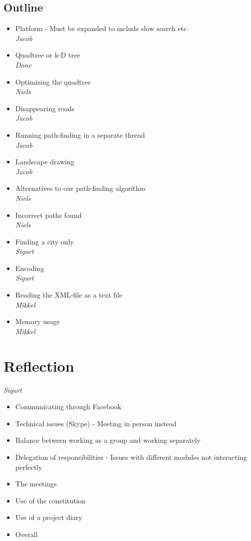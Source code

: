 \documentclass[a4paper,11pt]{article}
\begin{document}
\subsection{Outline}
\begin{itemize}
	\item Platform - Must be expanded to include slow search etc. \\
		\textsl{Jacob}
	\item Quadtree or k-D tree \\
		\textsl{Done}
	\item Optimizing the quadtree \\
		\textsl{Niels}
	\item Disappearing roads \\
		\textsl{Jacob}
	\item Running path-finding in a separate thread \\
		\textsl{Jacob}
	\item Landscape drawing \\
		\textsl{Jacob}
	\item Alternatives to our path-finding algorithm \\
		\textsl{Niels}
	\item Incorrect paths found \\
		\textsl{Niels}
	\item Finding a city only \\
		\textsl{Sigurt}
	\item Encoding \\
		\textsl{Sigurt}
	\item Reading the XML-file as a text file \\
		\textsl{Mikkel}
	\item Memory usage \\
		\textsl{Mikkel}
\end{itemize}


\pagebreak
\section{Reflection}
\textsl{Sigurt}
\begin{itemize}
	\item Communicating through Facebook
	\item Technical issues (Skype) - Meeting in person instead
	\item Balance between working as a group and working separately
	\item Delegation of responsibilities - Issues with different modules not interacting perfectly
	\item The meetings
	\item Use of the constitution
	\item Use of a project diary
	\item Overall
\end{itemize}
\end{document}
